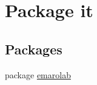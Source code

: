 \hypertarget{namespaceit}{\section{Package it}
\label{namespaceit}
}
\subsection*{Packages}
\begin{DoxyCompactItemize}
\item 
package \hyperlink{namespaceit_1_1emarolab}{emarolab}
\end{DoxyCompactItemize}
